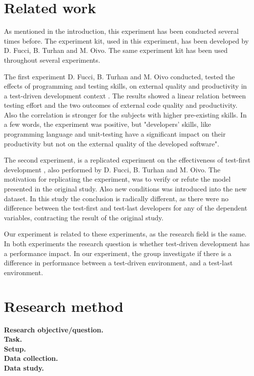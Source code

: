 \documentclass{sig-alternate-05-2015}
\begin{document}
\section{Related work}
As mentioned in the introduction, this experiment has been conducted several times before. The experiment kit, used in this experiment, has been developed by D. Fucci, B. Turhan and M. Oivo. The same experiment kit has been used throughout several experiments.

The first experiment D. Fucci, B. Turhan and M. Oivo conducted, tested the effects of programming and testing skills, on external quality and productivity in a test-driven development context \cite{fucci1}. The results showed a linear relation between testing effort and the two outcomes of external code quality and productivity. Also the correlation is stronger for the subjects with higher pre-existing skills. In a few words, the experiment was positive, but "developers' skills, like programming language and unit-testing have a significant impact on their productivity but not on the external quality of the developed software".

The second experiment, is a replicated experiment on the effectiveness of test-first development \cite{fucci2}, also performed by D. Fucci, B. Turhan and M. Oivo. The motivation for replicating the experiment, was to verify or refute the model presented in the original study. Also new conditions was introduced into the new dataset.
In this study the conclusion is radically different, as there were no difference between the test-first and test-last developers for any of the dependent variables, contracting the result of the original study.

Our experiment is related to these experiments, as the research field is the same. In both experiments \cite{fucci1, fucci2} the research question is whether test-driven development has a performance impact. In our experiment, the group investigate if there is a difference in performance between a test-driven environment, and a test-last environment.

\section{Research method}

\textbf{Research objective/question.}\\
\textbf{Task.}\\
\textbf{Setup.}\\
\textbf{Data collection.}\\
\textbf{Data study.}\\
\end{document}
